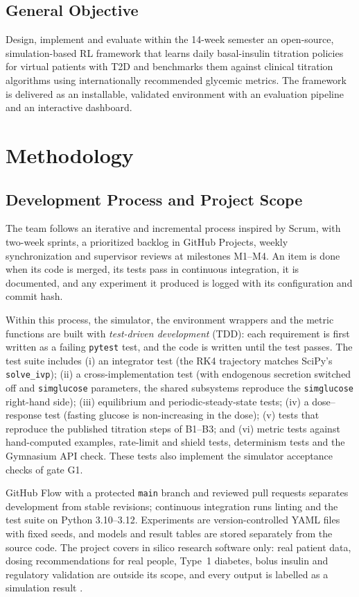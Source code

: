 \documentclass[conference]{IEEEtran}
\begin{document}
\subsection{General Objective}
Design, implement and evaluate within the 14-week semester an open-source, simulation-based RL
framework that learns daily basal-insulin titration policies for virtual patients with T2D and
benchmarks them against clinical titration algorithms using internationally recommended
glycemic metrics. The framework is delivered as an installable, validated environment with an
evaluation pipeline and an interactive dashboard.

\section{Methodology}

\subsection{Development Process and Project Scope}
The team follows an iterative and incremental process inspired by Scrum, with two-week
sprints, a prioritized backlog in GitHub Projects, weekly synchronization and supervisor reviews
at milestones M1--M4. An item is done when its code is merged, its tests pass in continuous
integration, it is documented, and any experiment it produced is logged with its configuration
and commit hash.

Within this process, the simulator, the environment wrappers and the metric functions are built
with \emph{test-driven development} (TDD): each requirement is first written as a failing
\texttt{pytest} test, and the code is written until the test passes. The test suite includes
(i) an integrator test (the RK4 trajectory matches SciPy's \texttt{solve\_ivp}); (ii) a
cross-implementation test (with endogenous secretion switched off and \texttt{simglucose}
parameters, the shared subsystems reproduce the \texttt{simglucose} right-hand side); (iii)
equilibrium and periodic-steady-state tests; (iv) a dose--response test (fasting glucose is
non-increasing in the dose); (v) tests that reproduce the published titration steps of B1--B3;
and (vi) metric tests against hand-computed examples, rate-limit and shield tests, determinism
tests and the Gymnasium API check. These tests also implement the simulator acceptance checks
of gate G1.

GitHub Flow with a protected \texttt{main} branch and reviewed pull requests separates
development from stable revisions; continuous integration runs linting and the test suite on
Python 3.10--3.12. Experiments are version-controlled YAML files with fixed seeds, and models and
result tables are stored separately from the source code. The project covers in silico research
software only: real patient data, dosing recommendations for real people, Type~1 diabetes,
bolus insulin and regulatory validation are outside its scope, and every output is labelled as a
simulation result \cite{gottesman2019}.
\end{document}
